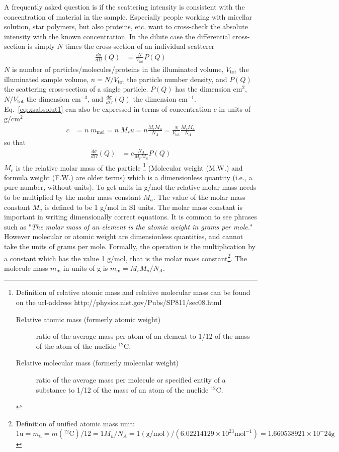 A frequently asked question is if the scattering intensity is consistent
with the concentration of material in the sample. Especially people working with micellar solution,
star polymers, but also proteins, etc. want to cross-check the absolute intensity with the known concentration.
In the dilute case the differential cross-section is simply $N$ times the cross-section of an individual scatterer
\begin{align}
\frac{d\sigma}{d\Omega}(Q) &= \frac{N}{V_\text{tot}} P(Q)
\label{eq:xsabsolut1}
\end{align}
$N$ is number of particles/molecules/proteins in the illuminated volume,
$V_\text{tot}$ the illuminated sample volume,
$n=N/V_\text{tot}$ the particle number density,
and $P(Q)$ the scattering cross-section of a single particle.
$P(Q)$ has the dimension cm$^{2}$, $N/V_\text{tot}$ the dimension cm$^{-3}$,
and $\frac{d\sigma}{d\Omega}(Q)$ the dimension cm$^{-1}$. Eq.\ \ref{eq:xsabsolut1}
can also be expressed in terms of concentration $c$ in units of $\mathrm{g}/\mathrm{cm}^2$
\begin{align}
c &= n\; m_\text{mol} = n\; M_r u = n\frac{M_rM_u}{N_A} =
\frac{N}{V_\text{tot}}\frac{M_r M_u}{N_A}
\end{align}
so that
\begin{align}
\frac{d\sigma}{d\Omega}(Q) &= c\frac{N_A}{M_r M_u} P(Q)
\label{eq:xsabsolut1}
\end{align}
$M_r$ is the relative molar mass of the particle
\footnote{
Definition of relative atomic mass and relative molecular mass can be found on the url-address
http://physics.nist.gov/Pubs/SP811/sec08.html
\begin{description}
\item[Relative atomic mass (formerly atomic weight)] ratio of the average mass per atom of an element to 1/12 of the mass of the atom of the nuclide $^{12}$C.
\item[Relative molecular mass (formerly molecular weight)] ratio of the average mass per molecule or specified entity of a substance to 1/12 of the mass of an atom of the nuclide $^{12}$C.
\end{description}
}
 (Molecular weight (M.W.) and formula weight (F.W.) are older terms) which is a
dimensionless quantity (i.e., a pure number, without units). To get
units in g/mol the relative molar mass needs to be multiplied by the
molar mass constant $M_u$.
The value of the molar mass constant $M_u$ is defined to be 1 g/mol in SI
units. The molar mass constant is important in writing
dimensionally correct equations. It is common to see phrases such
as "\emph{The molar mass of an element is the atomic weight in
grams per mole.}" However molecular or atomic weight are
dimensionless quantities, and cannot take the units of grams per
mole. Formally, the operation is the multiplication by a constant
which has the value 1 g/mol, that is the molar mass
constant\footnote{Definition of unified atomic mass unit: $1 \mathrm{u} = m_{\mathrm{u}} = m\left({}^{12}\mathrm{C}\right) / 12 = 1M_u/N_A=1\left(\mathrm{g}/\mathrm{mol}\right) / \left(6.02214129\times 10^{23} \mathrm{mol}^{-1}\right)=1.660538921\times 10^-{24}\mathrm{g}$}.
The molecule mass $m_\text{m}$ in units of g is $m_\text{m}=M_r M_u/N_A$.

